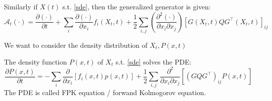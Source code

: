 \begin{theorem}
    Similarly if $X(t)$ s.t. \ref{sde}, then the generalized generator is given:
    \begin{equation}
        \mathcal{A}_{t}(\cdot)=\frac{\partial(\cdot)}{\partial t}+\sum_{i} \frac{\partial(\cdot)}{\partial x_{i}} f_{i}(X_t, t)+\frac{1}{2} \sum_{i, j}\left(\frac{\partial^{2}(\cdot)}{\partial x_{i} \partial x_{j}}\right)\left[G(X_t, t) Q G^{\top}(X_t, t)\right]_{i j}
    \end{equation}
\end{theorem}
We want to consider the density distribution of $X_t, P(x, t)$
\begin{theorem}
    The density function $P(x, t)$ of $X_t$ s.t. \ref{sde} solves the PDE:
    \begin{equation}
        \frac{\partial P(x, t)}{\partial t}=-\sum_{i} \frac{\partial}{\partial x_{i}}\left[f_{i}(x, t) p(x, t)\right]+\frac{1}{2} \sum_{i, j} \frac{\partial^{2}}{\partial x_{i} \partial x_{j}}\left[\left(G Q G^{\top}\right)_{i j} P(x, t)\right]
    \end{equation}
    The PDE is called FPK equation / forwand Kolmogorov equation.
\end{theorem}

